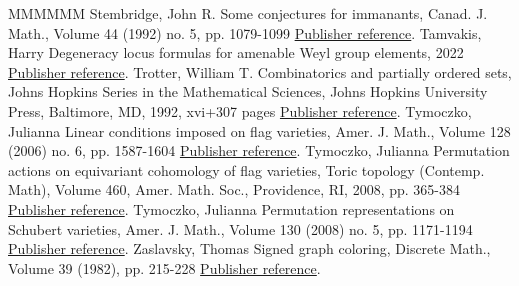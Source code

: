 \documentclass[11pt]{article}
\theoremstyle{definition}
\numberwithin{equation}{section}
\begin{document}
\begin{thebibliography}{MMMMMM}
 Stembridge, John R. Some conjectures for immanants, Canad. J. Math., Volume 44 (1992) no. 5, pp. 1079-1099 \href{https://alco.centre-mersenne.org/articles/10.5802/alco.459/#StemConj}{Publisher reference}.
 Tamvakis, Harry Degeneracy locus formulas for amenable Weyl group elements, 2022 \href{https://alco.centre-mersenne.org/articles/10.5802/alco.459/#TamvakisAmenable}{Publisher reference}.
 Trotter, William T. Combinatorics and partially ordered sets, Johns Hopkins Series in the Mathematical Sciences, Johns Hopkins University Press, Baltimore, MD, 1992, xvi+307 pages \href{https://alco.centre-mersenne.org/articles/10.5802/alco.459/#Trott}{Publisher reference}.
 Tymoczko, Julianna Linear conditions imposed on flag varieties, Amer. J. Math., Volume 128 (2006) no. 6, pp. 1587-1604 \href{https://alco.centre-mersenne.org/articles/10.5802/alco.459/#Ty1}{Publisher reference}.
 Tymoczko, Julianna Permutation actions on equivariant cohomology of flag varieties, Toric topology (Contemp. Math), Volume 460, Amer. Math. Soc., Providence, RI, 2008, pp. 365-384 \href{https://alco.centre-mersenne.org/articles/10.5802/alco.459/#Ty3}{Publisher reference}.
 Tymoczko, Julianna Permutation representations on Schubert varieties, Amer. J. Math., Volume 130 (2008) no. 5, pp. 1171-1194 \href{https://alco.centre-mersenne.org/articles/10.5802/alco.459/#Ty2}{Publisher reference}.
 Zaslavsky, Thomas Signed graph coloring, Discrete Math., Volume 39 (1982), pp. 215-228 \href{https://alco.centre-mersenne.org/articles/10.5802/alco.459/#ZaslavskySGC}{Publisher reference}.
\end{thebibliography}
\end{document}
